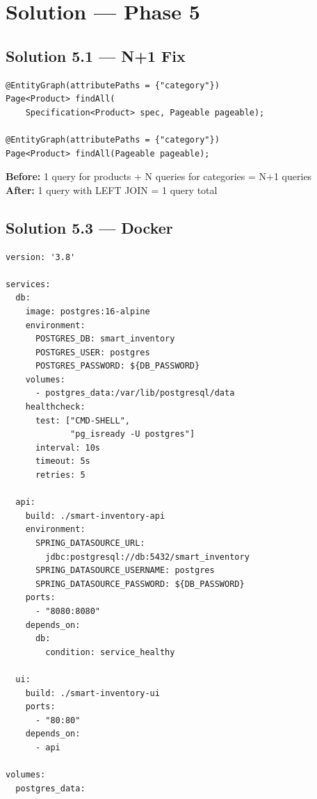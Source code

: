 \documentclass[12pt,a4paper]{report}
\begin{document}
\chapter{Solution --- Phase 5}

\section{Solution 5.1 --- N+1 Fix}

\begin{lstlisting}[style=javastyle, title={ProductRepository with @EntityGraph}]
@EntityGraph(attributePaths = {"category"})
Page<Product> findAll(
    Specification<Product> spec, Pageable pageable);

@EntityGraph(attributePaths = {"category"})
Page<Product> findAll(Pageable pageable);
\end{lstlisting}

\begin{infobox}
\textbf{Before:} 1 query for products + N queries for categories = N+1 queries\\
\textbf{After:} 1 query with LEFT JOIN = 1 query total
\end{infobox}

\section{Solution 5.3 --- Docker}

\begin{lstlisting}[style=dockerstyle, title={docker-compose.yml}]
version: '3.8'

services:
  db:
    image: postgres:16-alpine
    environment:
      POSTGRES_DB: smart_inventory
      POSTGRES_USER: postgres
      POSTGRES_PASSWORD: ${DB_PASSWORD}
    volumes:
      - postgres_data:/var/lib/postgresql/data
    healthcheck:
      test: ["CMD-SHELL",
             "pg_isready -U postgres"]
      interval: 10s
      timeout: 5s
      retries: 5

  api:
    build: ./smart-inventory-api
    environment:
      SPRING_DATASOURCE_URL:
        jdbc:postgresql://db:5432/smart_inventory
      SPRING_DATASOURCE_USERNAME: postgres
      SPRING_DATASOURCE_PASSWORD: ${DB_PASSWORD}
    ports:
      - "8080:8080"
    depends_on:
      db:
        condition: service_healthy

  ui:
    build: ./smart-inventory-ui
    ports:
      - "80:80"
    depends_on:
      - api

volumes:
  postgres_data:
\end{lstlisting}
\end{document}
